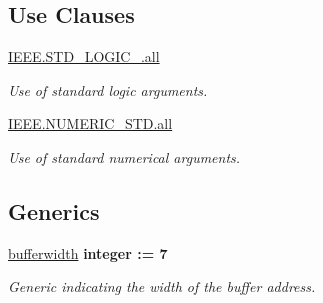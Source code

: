 \subsection*{Use Clauses}
 \begin{DoxyCompactItemize}
\item 
\hypertarget{classDAC__buffer_a68c233289eaf7d2601307bdd93b4c299}{\hyperlink{classDAC__buffer_a68c233289eaf7d2601307bdd93b4c299}{I\-E\-E\-E.\-S\-T\-D\-\_\-\-L\-O\-G\-I\-C\-\_.\-all}   }\label{classDAC__buffer_a68c233289eaf7d2601307bdd93b4c299}

\begin{DoxyCompactList}\small\item\em Use of standard logic arguments. \end{DoxyCompactList}\item 
\hypertarget{classDAC__buffer_a7c135c43c66ccd7f22abe5f6211788a5}{\hyperlink{classDAC__buffer_a7c135c43c66ccd7f22abe5f6211788a5}{I\-E\-E\-E.\-N\-U\-M\-E\-R\-I\-C\-\_\-\-S\-T\-D.\-all}   }\label{classDAC__buffer_a7c135c43c66ccd7f22abe5f6211788a5}

\begin{DoxyCompactList}\small\item\em Use of standard numerical arguments. \end{DoxyCompactList}\end{DoxyCompactItemize}
\subsection*{Generics}
 \begin{DoxyCompactItemize}
\item 
\hypertarget{classDAC__buffer_a2f94b7b31a8914ee23be5e000f89e921}{\hyperlink{classDAC__buffer_a2f94b7b31a8914ee23be5e000f89e921}{bufferwidth} {\bfseries {\bfseries \textcolor{comment}{integer}\textcolor{vhdlchar}{ }\textcolor{vhdlchar}{\-:}\textcolor{vhdlchar}{=}\textcolor{vhdlchar}{ } \textcolor{vhdldigit}{7} \textcolor{vhdlchar}{ }}}}\label{classDAC__buffer_a2f94b7b31a8914ee23be5e000f89e921}

\begin{DoxyCompactList}\small\item\em Generic indicating the width of the buffer address. \end{DoxyCompactList}\end{DoxyCompactItemize}
